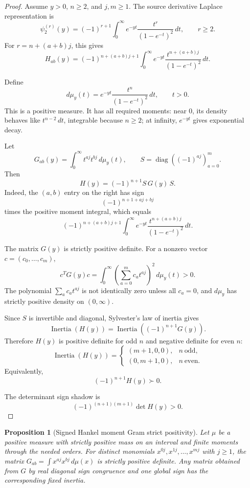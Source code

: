 \documentclass[11pt]{article}
\numberwithin{equation}{section}
\newtheorem{proposition}[theorem]{Proposition}
\theoremstyle{definition}
\theoremstyle{remark}
\newcommand{\1}{\mathbf 1}
\begin{document}
\begin{proof}
Assume \(y>0\), \(n\ge2\), and \(j,m\ge1\). The source derivative Laplace representation is
\[
\psi_2^{(r)}(y)=(-1)^{r+1}\int_0^\infty e^{-yt}\frac{t^r}{(1-e^{-t})^2}\,dt,
\qquad r\ge2.
\]
For \(r=n+(a+b)j\), this gives
\[
H_{ab}(y)=(-1)^{n+(a+b)j+1}
\int_0^\infty e^{-yt}\frac{t^{n+(a+b)j}}{(1-e^{-t})^2}\,dt.
\]

Define
\[
d\mu_y(t)=e^{-yt}\frac{t^n}{(1-e^{-t})^2}\,dt,\qquad t>0.
\]
This is a positive measure. It has all required moments: near \(0\), its density behaves like \(t^{n-2}\,dt\), integrable because \(n\ge2\); at infinity, \(e^{-yt}\) gives exponential decay.

Let
\[
G_{ab}(y)=\int_0^\infty t^{aj}t^{bj}\,d\mu_y(t),
\qquad
S=\operatorname{diag}((-1)^{aj})_{a=0}^{m}.
\]
Then
\[
H(y)=(-1)^{n+1}S\,G(y)\,S.
\]
Indeed, the \((a,b)\) entry on the right has sign
\[
(-1)^{n+1+aj+bj}
\]
times the positive moment integral, which equals
\[
(-1)^{n+(a+b)j+1}
\int_0^\infty e^{-yt}\frac{t^{n+(a+b)j}}{(1-e^{-t})^2}\,dt.
\]

The matrix \(G(y)\) is strictly positive definite. For a nonzero vector \(c=(c_0,\ldots,c_m)\),
\[
c^T G(y)c
=\int_0^\infty \left(\sum_{a=0}^m c_a t^{aj}\right)^2\,d\mu_y(t)>0.
\]
The polynomial \(\sum_a c_a t^{aj}\) is not identically zero unless all \(c_a=0\), and \(d\mu_y\) has strictly positive density on \((0,\infty)\).

Since \(S\) is invertible and diagonal, Sylvester's law of inertia gives
\[
\operatorname{Inertia}(H(y))=\operatorname{Inertia}((-1)^{n+1}G(y)).
\]
Therefore \(H(y)\) is positive definite for odd \(n\) and negative definite for even \(n\):
\[
\operatorname{Inertia}(H(y))=
\begin{cases}
(m+1,0,0),& n\ \text{odd},\\
(0,m+1,0),& n\ \text{even}.
\end{cases}
\]
Equivalently,
\[
(-1)^{n+1}H(y)\succ0.
\]

The determinant sign shadow is
\[
(-1)^{(n+1)(m+1)}\det H(y)>0.
\]
\end{proof}

\begin{proposition}[Signed Hankel moment Gram strict positivity]
\label{res:signed-hankel-moment-gram-strictpd}
Let \(\mu\) be a positive measure with strictly positive mass on an interval and finite moments through the needed orders. For distinct monomials \(x^{0j},x^{1j},\ldots,x^{mj}\) with \(j\ge1\), the matrix \(G_{ab}=\int x^{aj}x^{bj}\,d\mu(x)\) is strictly positive definite. Any matrix obtained from \(G\) by real diagonal sign congruence and one global sign has the corresponding fixed inertia.
\end{proposition}
\end{document}
